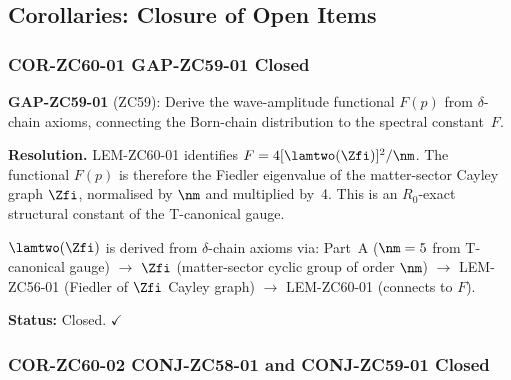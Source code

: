 \documentclass[12pt, a4paper]{article}
\begin{document}
\subsection{Corollaries: Closure of Open Items}
\label{sec:cors}

\subsubsection{COR-ZC60-01 \quad GAP-ZC59-01 Closed}

\begin{formalbox}[title={COR-ZC60-01: GAP-ZC59-01 Closed ---
  $F(p)$ from Spectral Geometry ($R_0$)}]
\textbf{GAP-ZC59-01} (ZC59): Derive the wave-amplitude
functional $F(p)$ from $\delta$-chain axioms, connecting
the Born-chain distribution to the spectral constant~$F$.

\medskip
\textbf{Resolution.}
LEM-ZC60-01 identifies $F = 4[\lamtwo(\Zfi)]^2/\nm$.
The functional $F(p)$ is therefore the Fiedler eigenvalue
of the matter-sector Cayley graph $\Zfi$, normalised by
$\nm$ and multiplied by~4.  This is an $R_0$-exact
structural constant of the T-canonical gauge.

$\lamtwo(\Zfi)$ is derived from $\delta$-chain axioms via:
Part~A ($\nm=5$ from T-canonical gauge) $\to$ $\Zfi$
(matter-sector cyclic group of order $\nm$) $\to$
LEM-ZC56-01 (Fiedler of $\Zfi$ Cayley graph) $\to$
LEM-ZC60-01 (connects to $F$).

\textbf{Status:} Closed. $\checkmark$
\end{formalbox}

\subsubsection{COR-ZC60-02 \quad CONJ-ZC58-01 and CONJ-ZC59-01 Closed}
\end{document}
